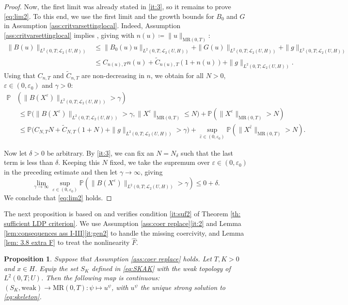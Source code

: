 \documentclass{amsart}
\renewcommand{\MR}{\mathrm{MR}}
\newcommand{\UH}{\mathscr{L}_2(U,H)}
\newcommand{\<}{\langle}
\newcommand{\?}{\rangle}
\newcommand{\ceqq}{\coloneqq}
\theoremstyle{plain}
\theoremstyle{remark}
\theoremstyle{plain}
\newtheorem{proposition}[theorem]{Proposition}
\numberwithin{equation}{section}
\renewcommand{\P}{\mathbb{P}}
\newcommand{\eps}{\varepsilon}
\begin{document}
\begin{proof}
Now, the first limit was already stated in \ref{it:3}, so it remains to prove \eqref{eq:lim2}.  To this end, we use the first limit and the growth bounds for $B_0$ and $G$ in Assumption \ref{ass:critvarsettinglocal}.   Indeed, Assumption \ref{ass:critvarsettinglocal} implies \cite[Lem.\ 3.8 (ii)(iv)]{TV24}, giving with $n(u)\ceqq \|u\|_{\MR(0,T)}$: 
\begin{align*}
\|B(u)\|_{L^2(0,T;\UH)}&\leq \|B_0(u)u\|_{L^2(0,T;\UH)}+\|G(u)\|_{L^2(0,T;\UH)}+\|g\|_{L^2(0,T;\UH)}\\
&\leq C_{n(u),T} n(u)+\tilde{C}_{n(u),T}(1+n(u))+\|g\|_{L^2(0,T;\UH)}. 
\end{align*}
Using that $C_{n ,T}$ and $\tilde{C}_{n,T}$ are non-decreasing in $n$, we obtain for all $N>0$, $\eps\in(0,\eps_0)$ and $\gamma>0$:
\begin{align*}
\P&(\|B(X^\eps)\|_{L^2(0,T;\UH)}>\gamma)\\
&\;\leq 
\P\big(\|B(X^\eps)\|_{L^2(0,T;\UH)}>\gamma, \|X^\eps\|_{\MR(0,T)}\leq N\big) +\P(\|X^\eps\|_{\MR(0,T)}>N)\\
&\;\leq \P\big(C_{N,T} N+\tilde{C}_{N,T}(1+N)+\|g\|_{L^2(0,T;\UH)}>\gamma\big) +\sup_{\hat{\eps}\in(0,\eps_0)}\P(\|X^{\hat{\eps}}\|_{\MR(0,T)}>N).
\end{align*}

Now let $\delta>0$ be arbitrary. By \ref{it:3}, we can fix an $N=N_\delta$ such that the last term is less than $\delta$. Keeping this $N$ fixed, we take the supremum over $\eps\in(0,\eps_0)$ in the preceding estimate and then let $\gamma\to\infty$, giving $$\lim_{\gamma\to\infty}\sup_{{\eps}\in(0,\eps_0)}\P(\|B(X^\eps)\|_{L^2(0,T;\UH)}>\gamma)\leq 0+\delta.$$ 
We conclude that \eqref{eq:lim2} holds. 
\end{proof} 

The next proposition is based on \cite[Prop.\ 4.9]{TV24} and verifies condition \ref{it:suf2} of Theorem \ref{th: sufficient LDP criterion}. We use Assumption \ref{ass:coer replace}\ref{it:2} and Lemma \ref{lem:consequences ass I-III}\ref{it:gen2} to handle the missing coercivity, and  Lemma \ref{lem: 3.8 extra F} to treat the nonlinearity $\hat{F}$. 
 
\begin{proposition}\label{prop:cpt sublevel sets}
Suppose that Assumption \ref{ass:coer replace} holds. Let $T,K> 0$ and $x\in H$. Equip the set $S_K$ defined in \eqref{eq:SKAK} with the weak topology of $L^2(0,T;U)$. 
Then the following map is continuous:  $(S_K,\mathrm{weak})\to \MR(0,T)\colon  \psi\mapsto u^{\psi}$, with $u^\psi$  the unique strong solution to \eqref{eq:skeleton}. 
\end{proposition}
 
\end{document}
